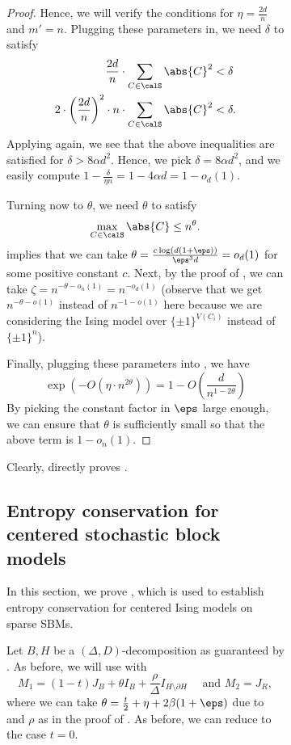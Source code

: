 \documentclass[11pt,letterpaper]{article}
\begin{document}
\begin{figure}
\begin{figure}
\begin{proof}
    Hence, we will verify the conditions for $\eta = \frac{2d}{n}$ and $m' = n$.
    Plugging these parameters in, we need $\delta$ to satisfy
    \begin{align*}
        \frac{2 d}{n} \cdot \sum_{C \in \calS} \abs{C}^2 &< \delta \\
        2 \cdot \left(\frac{2d}{n}\right)^2 \cdot n \cdot \sum_{C \in \calS} \abs{C}^2 &< \delta.
    \end{align*}
    Applying  again, we see that the above inequalities are satisfied for $\delta > 8\alpha d^2$.
    Hence, we pick $\delta = 8\alpha d^2$, and we easily compute $1 - \frac{\delta}{\eta n} = 1 - 4\alpha d = 1 - o_d(1)$.

    Turning now to $\theta$, we need $\theta$ to satisfy 
    \[
        \max_{C \in \calS} \abs{C} \le  n^{\theta}.
    \]
     implies that we can take $\theta = \frac{c\log(d(1+\eps))}{\eps^3 d} = o_d(1)$ for some positive constant $c$. 
    Next, by the proof of , we can take $\zeta = n^{-\theta - o_n(1)} = n^{-o_d(1)}$ (observe that we get $n^{-\theta-o(1)}$ instead of $n^{-1-o(1)}$ here because we are considering the Ising model over $\{ \pm 1\}^{V(C_i)}$ instead of $\{\pm 1\}^n$).


    Finally, plugging these parameters into , we have 
    \[
        \exp(-O(\eta \cdot n^{2\theta})) = 1 - O\left(\frac{d}{n^{1-2\theta}}\right)
    \]
    By picking the constant factor in $\eps$ large enough, we can ensure that $\theta$ is sufficiently small so that the above term is $1 - o_n(1)$. 
\end{proof}
Clearly,  directly proves .

\subsection{Entropy conservation for centered stochastic block models}
\label{sec:centered-adjacency}

In this section, we prove , which is used to establish entropy conservation for centered Ising models on sparse SBMs.

\centeredadjacency*

Let $B,H$ be a $(\Delta, D)$-decomposition as guaranteed by .
As before, we will use  with 
\[
    M_1 = (1-t)J_B + \theta I_B + \frac{\rho}{\Delta} I_{H \setminus \partial H}  \quad \text{ and } M_2 = J_R,
\]
where we can take $\theta = \frac{t}{2} + \eta + 2\beta(1+\eps)$ due to  and $\rho$ as in the proof of .
As before, we can reduce to the case $t=0$. 


\end{figure}
\end{figure}
\end{document}
